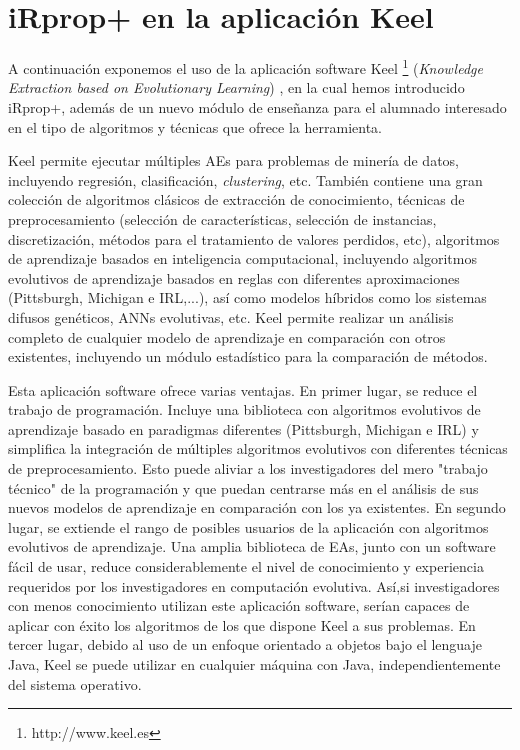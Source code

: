 \paginavaciacompleta
\chapter{iRprop+ en la aplicación Keel}\label{anexo}
A continuación exponemos el uso de la aplicación software Keel \footnote{http://www.keel.es}
(\textit{Knowledge Extraction based on Evolutionary Learning}) \cite{Keel2009} \noindent, en la
cual hemos introducido iRprop+, además de un nuevo módulo de enseñanza para el alumnado
interesado en el tipo de algoritmos y técnicas que ofrece la herramienta.

Keel permite ejecutar
múltiples AEs para problemas de minería de datos, incluyendo regresión,
clasificación, \textit{clustering}, etc. También contiene una gran colección de algoritmos clásicos
de extracción de conocimiento, técnicas de preprocesamiento (selección de características, selección
de instancias, discretización, métodos para el tratamiento de valores perdidos, etc), algoritmos de
aprendizaje basados en inteligencia computacional, incluyendo algoritmos evolutivos de
aprendizaje basados en reglas con diferentes aproximaciones (Pittsburgh, Michigan e IRL,...), así
como modelos híbridos como los sistemas difusos genéticos, ANNs evolutivas, etc. Keel
permite realizar un análisis completo de cualquier modelo de aprendizaje en comparación con otros
existentes, incluyendo un módulo estadístico para la comparación de
métodos.

Esta aplicación software ofrece varias ventajas. En primer lugar, se reduce el trabajo de
programación. Incluye una biblioteca con algoritmos evolutivos de aprendizaje basado en paradigmas
diferentes (Pittsburgh, Michigan e IRL) y simplifica la integración de múltiples algoritmos
evolutivos con diferentes técnicas de preprocesamiento. Esto puede aliviar a los investigadores del
mero "trabajo técnico" de la programación y que puedan centrarse más en el análisis de sus nuevos
modelos de aprendizaje en comparación con los ya existentes. En segundo lugar, se extiende el rango
de posibles usuarios de la aplicación con algoritmos evolutivos de aprendizaje. Una amplia
biblioteca de EAs, junto con un software fácil de usar, reduce considerablemente el nivel de
conocimiento y experiencia requeridos por los investigadores en computación evolutiva. Así,si
investigadores con menos conocimiento utilizan este aplicación software, serían capaces de
aplicar
con éxito los algoritmos de los que dispone Keel a sus problemas. En tercer lugar, debido al uso de
un enfoque orientado a objetos bajo el lenguaje Java, Keel se puede utilizar en cualquier máquina
con Java, independientemente del sistema operativo.

